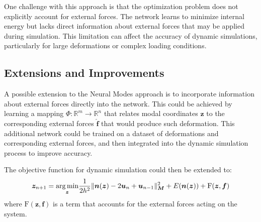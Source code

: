 One challenge with this approach is that the optimization problem does not explicitly account for external forces. The network learns to minimize internal energy but lacks direct information about external forces that may be applied during simulation. This limitation can affect the accuracy of dynamic simulations, particularly for large deformations or complex loading conditions.

\subsection{Extensions and Improvements}
A possible extension to the Neural Modes approach is to incorporate information about external forces directly into the network. This could be achieved by learning a mapping $\Phi: \mathbb{R}^m \rightarrow \mathbb{R}^n$ that relates modal coordinates $\bm{z}$ to the corresponding external forces $\hat{\bm{f}}$ that would produce such deformation. This additional network could be trained on a dataset of deformations and corresponding external forces, and then integrated into the dynamic simulation process to improve accuracy.

The objective function for dynamic simulation could then be extended to:
\begin{equation}
    \bm{z}_{n+1} = \underset{\bm{z}}{\operatorname*{arg\,min}} \frac{1}{2h^2} \|\bm{n}(\bm{z}) - 2\bm{u}_n + \bm{u}_{n-1}\|_{\bm{M}}^2 + E(\bm{n}(\bm{z})) + \text{F}(\bm{z}, \bm{f})
\end{equation}
where $\text{F}(\bm{z}, \bm{f})$ is a term that accounts for the external forces acting on the system.